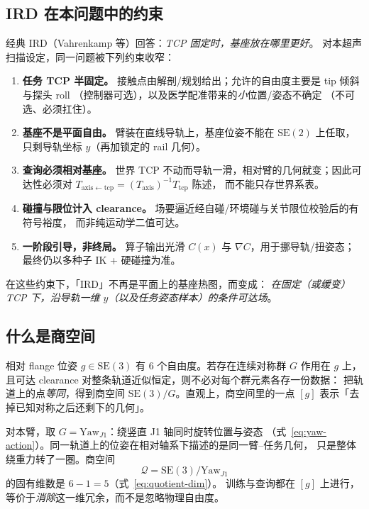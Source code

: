 \documentclass[UTF8,a4paper,11pt,fontset=fandol]{ctexart}
\newcommand{\SE}{\mathrm{SE}}
\newcommand{\Tcp}{T_{\mathrm{tcp}}}
\newcommand{\Taxis}{T_{\mathrm{axis}}}
\begin{document}
\subsection{IRD 在本问题中的约束}
\label{sec:ird-constraints}

经典 IRD（Vahrenkamp 等）回答：\emph{TCP 固定时，基座放在哪里更好}。
对本超声扫描设定，同一问题被下列约束收窄：

\begin{enumerate}[leftmargin=1.6em]
  \item \textbf{任务 TCP 半固定。}
        接触点由解剖/规划给出；允许的自由度主要是 tip 倾斜与探头 roll
        （控制器可选），以及医学配准带来的\emph{小}位置/姿态不确定
        （不可选、必须扛住）。
  \item \textbf{基座不是平面自由。}
        臂装在直线导轨上，基座位姿不能在 \(\SE(2)\) 上任取，
        只剩导轨坐标 \(y\)（再加锁定的 rail 几何）。
  \item \textbf{查询必须相对基座。}
        世界 TCP 不动而导轨一滑，相对臂的几何就变；因此可达性必须对
        \(T_{\mathrm{axis\leftarrow tcp}}=(\Taxis)^{-1}\Tcp\) 陈述，
        而不能只存世界系表。
  \item \textbf{碰撞与限位计入 clearance。}
        场要逼近经自碰/环境碰与关节限位校验后的有符号裕度，
        而非纯运动学二值可达。
  \item \textbf{一阶段引导，非终局。}
        算子输出光滑 \(C(x)\) 与 \(\nabla C\)，用于挪导轨/扭姿态；
        最终仍以多种子 IK + 硬碰撞为准。
\end{enumerate}

在这些约束下，「IRD」不再是平面上的基座热图，而变成：
\emph{在固定（或缓变）TCP 下，沿导轨一维 \(y\)（以及任务姿态样本）的条件可达场}。

\subsection{什么是商空间}
\label{sec:what-quotient}

相对 flange 位姿 \(g\in\SE(3)\) 有 6 个自由度。若存在连续对称群 \(G\) 作用在
\(g\) 上，且可达 clearance 对整条轨道近似恒定，则不必对每个群元素各存一份数据：
把轨道上的点\emph{等同}，得到商空间 \(\SE(3)/G\)。直观上，商空间里的一点
\([g]\) 表示「去掉已知对称之后还剩下的几何」。

对本臂，取 \(G=\mathrm{Yaw}_{J1}\)：绕竖直 J1 轴同时旋转位置与姿态
（式~\eqref{eq:yaw-action}）。同一轨道上的位姿在相对轴系下描述的是同一臂--任务几何，
只是整体绕重力转了一圈。商空间
\[
  \mathcal{Q}=\SE(3)/\mathrm{Yaw}_{J1}
\]
的固有维数是 \(6-1=5\)（式~\eqref{eq:quotient-dim}）。
训练与查询都在 \([g]\) 上进行，等价于\emph{消除}这一维冗余，而不是忽略物理自由度。
\end{document}
